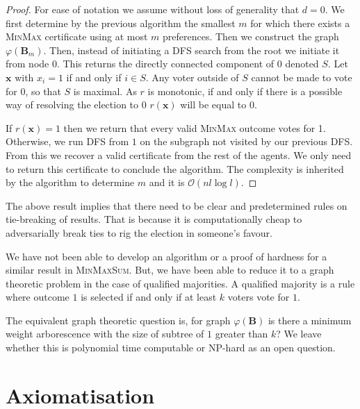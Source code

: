 \documentclass[11pt,a4paper, titlepage]{article}
\theoremstyle{definition}
\let\vec\mathbf
\begin{document}
\begin{proof}

    For ease of notation we assume without loss of generality that $d = 0$.
    We first determine by the previous algorithm the smallest $m$ for which there exists a \textsc{MinMax} certificate using at most $m$ preferences.
    Then we construct the graph $\varphi(\vec{B}_m)$.
    Then, instead of initiating a DFS search from the root we initiate it from node $0$.
    This returns the directly connected component of $0$ denoted $S$.
    Let $\vec{x}$ with $x_i = 1$ if and only if $i \in S$.
    Any voter outside of $S$  cannot be made to vote for $0$, so that $S$ is maximal. As $r$ is monotonic, if and only if  there is a possible way of resolving the election to $0$ $r(\vec{x})$ will be equal to 0.

    If $r(\vec{x}) = 1$ then we return that every valid \textsc{MinMax} outcome votes for 1.
    Otherwise, we run DFS from $1$ on the subgraph not visited by our previous DFS.
    From this we recover a valid certificate from the rest of the agents.
    We only need to return this certificate to conclude the algorithm.
    The complexity is inherited by the algorithm to determine $m$ and it is $\mathcal{O}(nl \log l)$.
\end{proof}

The above result implies that there need to be clear and predetermined rules on tie-breaking of results.
That is because it is computationally cheap to adversarially break ties to rig the election in someone's favour.

We have not been able to develop an algorithm or a proof of hardness for a similar result in \textsc{MinMaxSum}.
But, we have been able to reduce it to a graph theoretic problem in the case of qualified majorities.
A qualified majority is a rule where outcome $1$ is selected if and only if at least $k$ voters vote for $1$.

The equivalent graph theoretic question is, for graph $\varphi(\vec{B})$ is there a minimum weight arborescence with the size of subtree of $1$ greater than $k$? We leave whether this is polynomial time computable or NP-hard as an open question.

\newpage
\section{Axiomatisation}
\label{section:axioms}
\end{document}
